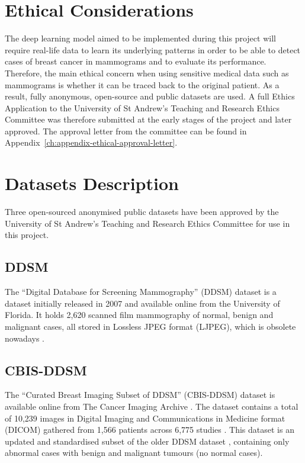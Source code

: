 \section{Ethical Considerations}

The deep learning model aimed to be implemented during this project will require real-life data to learn its underlying patterns in order to be able to detect cases of breast cancer in mammograms and to evaluate its performance. Therefore, the main ethical concern when using sensitive medical data such as  mammograms is whether it can be traced back to the original patient. As a result, fully anonymous, open-source and public datasets are used. A full Ethics Application to the University of St Andrew's Teaching and Research Ethics Committee was therefore submitted at the early stages of the project and later approved. The approval letter from the committee can be found in Appendix~\ref{ch:appendix-ethical-approval-letter}.


\section{Datasets Description}

Three open-sourced anonymised public datasets have been approved by the University of St Andrew's Teaching and Research Ethics Committee for use in this project.

\subsection{DDSM}

The ``Digital Database for Screening Mammography'' (DDSM) dataset is a dataset initially released in 2007 and available online from the University of Florida. It holds 2,620 scanned film mammography of normal, benign and malignant cases, all stored in Lossless JPEG format (LJPEG), which is obsolete nowadays \citep{MichaelHeathKevinBowyerDanielKopans2001}.

\subsection{CBIS-DDSM}

The ``Curated Breast Imaging Subset of DDSM'' (CBIS-DDSM) dataset \citep{Lee2017} is available online from The Cancer Imaging Archive \citep{Clark2013}. The dataset contains a total of 10,239 images in Digital Imaging and Communications in Medicine format (DICOM) gathered from 1,566 patients across 6,775 studies \citep{Lee2017}. This dataset is an updated and standardised subset of the older DDSM dataset \citep{DDSMdataset2001}, containing only abnormal cases with benign and malignant tumours (no normal cases).

